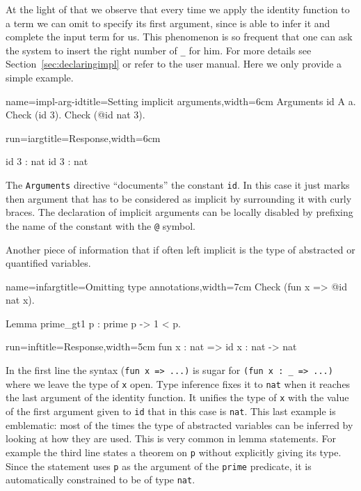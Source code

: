 At the light of that we observe that every time we apply the identity
function to a term we can omit to specify its first argument,
since \Coq{} is able to infer it and complete the input term for us.
This phenomenon is so frequent that one can ask the system to insert
the right number of \lstinline/_/ for him.  For more details see
Section~\ref{sec:declaringimpl} or refer to the user manual.  Here
we only provide a simple example.

\begin{coq}{name=impl-arg-id}{title=Setting implicit arguments,width=6cm}
Arguments id {A} a.
Check (id 3).
Check (@id nat 3).
\end{coq}
\begin{coqout}{run=iarg}{title=Response,width=6cm}

id 3 : nat
id 3 : nat
\end{coqout}

The \lstinline/Arguments/ directive ``documents'' the constant
\lstinline/id/.  In this case it just marks then argument that has to
be considered as implicit by surrounding it with curly braces.
The declaration of implicit arguments can be locally disabled by
prefixing the name of the constant with the \lstinline/@/ symbol.

Another piece of information that if often left implicit is
the type of abstracted or quantified variables.

\begin{coq}{name=infarg}{title=Omitting type annotations,width=7cm}
Check (fun x => @id nat x).

Lemma prime_gt1 p : prime p -> 1 < p.
\end{coq}
\begin{coqout}{run=inf}{title=Response,width=5cm}
fun x : nat => id x :
  nat -> nat
$~$
\end{coqout}

In the first line the syntax (\lstinline/fun x => ...)/ is sugar for
\lstinline/(fun x : _ => ...)/ where we leave the type of
\lstinline/x/ open.  Type inference fixes it to \lstinline/nat/
when it reaches the last argument of the identity function.
It unifies the type of \lstinline/x/ with the value of the first
argument given to \lstinline/id/ that in this case is \lstinline/nat/.
This last example is emblematic: most of the times the type of
abstracted variables can be inferred by looking at how they are used.
This is very common in lemma statements.  For example the third line
states a theorem on \lstinline/p/ without explicitly giving its type.
Since the statement uses \lstinline/p/ as the argument of the
\lstinline/prime/ predicate, it is automatically constrained to be
of type \lstinline/nat/.

